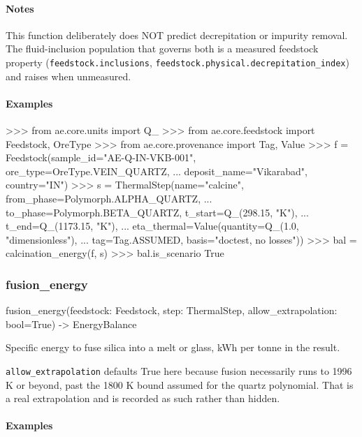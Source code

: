 \documentclass[10pt,a4paper,twoside]{report}
\begin{document}
\paragraph*{Notes}

This function deliberately does NOT predict decrepitation or impurity removal. The fluid-inclusion population that governs both is a measured feedstock property (\texttt{feedstock.inclusions}, \texttt{feedstock.physical.decrepitation\_index}) and raises when unmeasured.

\paragraph*{Examples}

\begin{doctestblock}
>>> from ae.core.units import Q_
>>> from ae.core.feedstock import Feedstock, OreType
>>> from ae.core.provenance import Tag, Value
>>> f = Feedstock(sample_id="AE-Q-IN-VKB-001", ore_type=OreType.VEIN_QUARTZ,
...               deposit_name="Vikarabad", country="IN")
>>> s = ThermalStep(name="calcine", from_phase=Polymorph.ALPHA_QUARTZ,
...                 to_phase=Polymorph.BETA_QUARTZ, t_start=Q_(298.15, "K"),
...                 t_end=Q_(1173.15, "K"),
...                 eta_thermal=Value(quantity=Q_(1.0, "dimensionless"),
...                                   tag=Tag.ASSUMED, basis="doctest, no losses"))
>>> bal = calcination_energy(f, s)
>>> bal.is_scenario
True
\end{doctestblock}

\subsubsection*{fusion\_energy}

\begin{verbatimsmall}
fusion_energy(feedstock: Feedstock, step: ThermalStep, allow_extrapolation: bool=True) -> EnergyBalance
\end{verbatimsmall}

Specific energy to fuse silica into a melt or glass, kWh per tonne in the result.

\texttt{allow\_extrapolation} defaults True here because fusion necessarily runs to 1996 K or beyond, past the 1800 K bound assumed for the quartz polynomial. That is a real extrapolation and is recorded as such rather than hidden.

\paragraph*{Examples}
\end{document}
